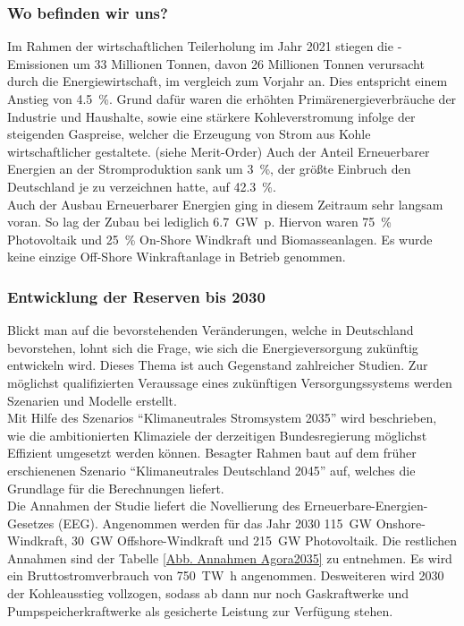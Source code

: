 		\subsubsection{Wo befinden wir uns?}
		Im Rahmen der wirtschaftlichen Teilerholung im Jahr 2021 stiegen die \SI{}{\COtwo}-Emissionen um 33 Millionen Tonnen, davon 26 Millionen Tonnen verursacht durch die Energiewirtschaft, im vergleich zum Vorjahr an. Dies entspricht einem Anstieg von \SI{4,5}{\percent}. Grund dafür waren die erhöhten Primärenergieverbräuche der Industrie und Haushalte, sowie eine stärkere Kohleverstromung infolge der steigenden Gaspreise, welcher die Erzeugung von Strom aus Kohle wirtschaftlicher gestaltete. (siehe Merit-Order) Auch der Anteil Erneuerbarer Energien an der Stromproduktion sank um \SI{3}{\percent}, der größte Einbruch den Deutschland je zu verzeichnen hatte, auf \SI{42,3}{\percent}.\\
		
		Auch der Ausbau Erneuerbarer Energien ging in diesem Zeitraum sehr langsam voran. So lag der Zubau bei lediglich \SI{6,7}{\giga \watt p}. Hiervon waren \SI{75}{\percent} Photovoltaik und \SI{25}{\percent} On-Shore Windkraft und Biomasseanlagen. Es wurde keine einzige Off-Shore Winkraftanlage in Betrieb genommen. 
		
		
		\subsubsection{Entwicklung der Reserven bis 2030} \label{sect: 2030}
		Blickt man auf die bevorstehenden Veränderungen, welche in Deutschland bevorstehen, lohnt sich die Frage, wie sich die Energieversorgung zukünftig entwickeln wird. Dieses Thema ist auch Gegenstand zahlreicher Studien. Zur möglichst qualifizierten Veraussage eines zukünftigen Versorgungssystems werden Szenarien und Modelle erstellt.\\
		
		Mit Hilfe des Szenarios "`Klimaneutrales Stromsystem 2035"' wird beschrieben, wie die ambitionierten Klimaziele der derzeitigen Bundesregierung möglichst Effizient umgesetzt werden können. Besagter Rahmen baut auf dem früher erschienenen Szenario "`Klimaneutrales Deutschland 2045"' auf, welches die Grundlage für die Berechnungen liefert.\\
		Die Annahmen der Studie liefert die Novellierung des Erneuerbare-Energien-Gesetzes (EEG). Angenommen werden für das Jahr 2030 \SI{115}{\giga \watt} Onshore-Windkraft, \SI{30}{\giga \watt} Offshore-Windkraft und \SI{215}{\giga \watt} Photovoltaik. Die restlichen Annahmen sind der Tabelle \ref{Abb. Annahmen Agora2035} zu entnehmen.	Es wird ein Bruttostromverbrauch von \SI{750}{\tera \watt \hour} angenommen. Desweiteren wird 2030 der Kohleausstieg vollzogen, sodass ab dann nur noch Gaskraftwerke und Pumpspeicherkraftwerke als gesicherte Leistung zur Verfügung stehen.\\
		
